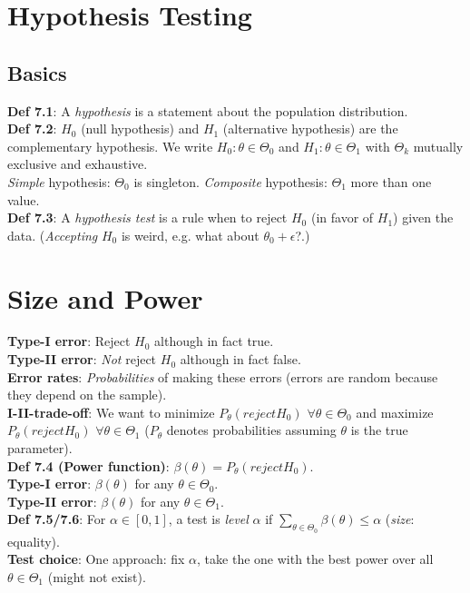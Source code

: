 \section{Hypothesis Testing}
\subsection{Basics}
\textbf{Def 7.1}: A \emph{hypothesis} is a statement about the population distribution.\\
\textbf{Def 7.2}: $H_0$ (null hypothesis) and $H_1$ (alternative hypothesis) are the complementary hypothesis. We write $H_0:\theta\in\Theta_0$ and $H_1:\theta\in\Theta_1$ with $\Theta_k$ mutually exclusive and exhaustive.\\
\emph{Simple} hypothesis: $\Theta_0$ is singleton. \emph{Composite} hypothesis: $\Theta_1$ more than one value.\\
\textbf{Def 7.3}: A \emph{hypothesis test} is a rule when to reject $H_0$ (in favor of $H_1$) given the data. \footnotesize{(\textit{Accepting} $H_0$ is weird, e.g. what about $\theta_0+\epsilon$?.)}\\

\section{Size and Power}
\textbf{Type-I error}: Reject $H_0$ although in fact true.\\
\textbf{Type-II error}: \emph{Not} reject $H_0$ although in fact false.\\
\textbf{Error rates}: \emph{Probabilities} of making these errors \footnotesize{(errors are random because they depend on the sample)}.\\
\textbf{I-II-trade-off}: We want to minimize $P_\theta(reject H_0)$ $\forall \theta\in\Theta_0$ and maximize $P_\theta(reject H_0)$ $\forall \theta\in\Theta_1$ \footnotesize{($P_\theta$ denotes probabilities assuming $\theta$ is the true parameter).}\\
\textbf{Def 7.4 (Power function)}: $\beta(\theta) = P_\theta(reject H_0)$.\\
\textbf{Type-I error}: $\beta(\theta)$ for any $\theta\in\Theta_0$.\\
\textbf{Type-II error}: $\beta(\theta)$ for any $\theta\in\Theta_1$.\\
\textbf{Def 7.5/7.6}: For $\alpha\in[0,1]$, a test is \emph{level} $\alpha$ if $\sum_{\theta\in\Theta_0}\beta(\theta)\leq\alpha$ (\emph{size}: equality).\\
\textbf{Test choice}: One approach: fix $\alpha$, take the one with the best power over all $\theta\in\Theta_1$ (might not exist).\\

